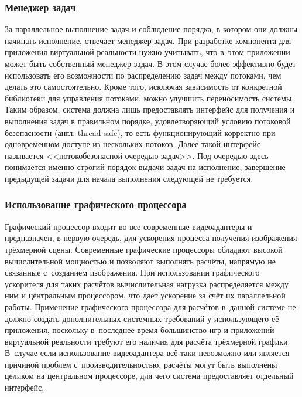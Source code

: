 \documentclass[a4paper, 14pt, titlepage]{extarticle}
\newcommand{\eng}[1]{{\English #1}}
\begin{document}
      \subsubsection{Менеджер задач}\label{sssec:task_manager}

        За параллельное выполнение задач и соблюдение порядка, в котором они должны начинать
        исполнение, отвечает менеджер задач. При разработке компонента
        для приложения виртуальной реальности нужно учитывать, что в~этом приложении
        может быть собственный менеджер задач. В этом случае более эффективно
        будет использовать его возможности по распределению задач между потоками, чем делать это
        самостоятельно. Кроме того, исключая зависимость от конкретной библиотеки для управления
        потоками, можно улучшить переносимость системы. Таким образом, система должна лишь
        предоставлять интерфейс для получения и выполнения задач в правильном порядке,
        удовлетворяющий условию потоковой безопасности (англ. \eng{thread-safe}), то есть
        функционирующий корректно при одновременном доступе из нескольких потоков. Далее такой
        интерфейс называется <<потокобезопасной очередью задач>>. Под очередью здесь понимается именно строгий порядок выдачи
        задач на исполнение, завершение предыдущей задачи для начала выполнения следующей не требуется.

      \subsubsection{Использование графического процессора}\label{sssec:using_gpu}

        Графический процессор входит во все современные видеоадаптеры и предназначен, в
        первую очередь, для ускорения процесса получения изображения трёхмерной сцены. Современные
        графические процессоры обладают высокой вычислительной мощностью и позволяют выполнять
        расчёты, напрямую не связанные с~созданием изображения. При использовании графического
        ускорителя для таких расчётов вычислительная нагрузка распределяется между ним и центральным
        процессором, что даёт ускорение за счёт их параллельной работы. Применение графического
        процессора для расчётов в~данной системе не должно создать дополнительных системных
        требований у использующего её приложения, поскольку в~последнее время большинство игр и
        приложений виртуальной реальности требуют его наличия для расчёта трёхмерной графики. В~случае если
        использование видеоадаптера всё-таки невозможно или является причиной проблем
        с~производительностью, расчёты могут быть выполнены целиком на центральном процессоре, для
        чего система предоставляет отдельный интерфейс.
\end{document}
